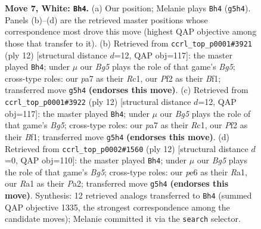 \documentclass[11pt]{article}
\begin{document}
\begin{figure}[p]
\caption{\textbf{Move 7, White: \texttt{Bh4}.} (a) Our position; Melanie plays \texttt{Bh4} (\texttt{g5h4}). Panels (b)--(d) are the retrieved master positions whose correspondence most drove this move (highest QAP objective among those that transfer to it). (b) Retrieved from \texttt{ccrl\_top\_p0001\#3921} (ply 12) [structural distance $d$=12, QAP obj=117]: the master played \texttt{Bh4}; under $\mu$ our \emph{Bg5} plays the role of that game's \emph{Bg5}; cross-type roles: our \emph{p}a7 as their \emph{R}c1, our \emph{P}f2 as their \emph{B}f1; transferred move \texttt{g5h4} \textbf{(endorses this move)}. (c) Retrieved from \texttt{ccrl\_top\_p0001\#3922} (ply 12) [structural distance $d$=12, QAP obj=117]: the master played \texttt{Bh4}; under $\mu$ our \emph{Bg5} plays the role of that game's \emph{Bg5}; cross-type roles: our \emph{p}a7 as their \emph{R}c1, our \emph{P}f2 as their \emph{B}f1; transferred move \texttt{g5h4} \textbf{(endorses this move)}. (d) Retrieved from \texttt{ccrl\_top\_p0002\#1560} (ply 12) [structural distance $d$=0, QAP obj=110]: the master played \texttt{Bh4}; under $\mu$ our \emph{Bg5} plays the role of that game's \emph{Bg5}; cross-type roles: our \emph{p}e6 as their \emph{R}a1, our \emph{R}a1 as their \emph{P}a2; transferred move \texttt{g5h4} \textbf{(endorses this move)}. Synthesis: 12 retrieved analogs transferred to \texttt{Bh4} (summed QAP objective 1335, the strongest correspondence among the candidate moves); Melanie committed it via the \texttt{search} selector.}
\label{fig:thought-m12}
\end{figure}

\clearpage
\end{document}
